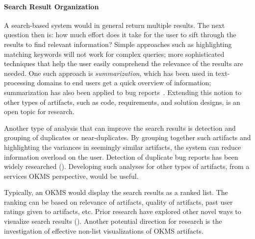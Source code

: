 \paragraph*{Search Result Organization}
A search-based system would in general return multiple results. The next
question then is: how much effort does it take for the user to sift through the
results to find relevant information? Simple approaches such as highlighting
matching keywords will not work for complex queries; more sophisticated
techniques that help the user easily comprehend the relevance of the results are
needed. One such approach is \textit{summarization}, which has been used in
text-processing domains to end users get a quick overview of information;
summarization has also been applied to bug
reports~\cite{Mani:2012,Rastkar:2010}. Extending this notion to other types of
artifacts, such as code, requirements, and solution designs, is an open topic
for research.

Another type of analysis that can improve the search results is detection and
grouping of duplicates or near-duplicates. By grouping together such artifacts
and highlighting the variances in seemingly similar artifacts, the system can
reduce information overload on the user.  Detection of duplicate bug reports has
been widely researched
(\eg \cite{wang2008approach,sun2010discriminative}). Developing such analyses
for other types of artifacts, from a services OKMS perspective, would be useful.

Typically, an OKMS would display the search results as a ranked list. The
ranking can be based on relevance of artifacts, quality of artifacts, past user
ratings given to artifacts, etc. Prior research have explored other novel ways
to visualize search results (\eg \cite{Nowell:1996,Shneiderman:2000}).  Another
potential direction for research is the investigation of effective non-list
visualizations of OKMS artifacts.


